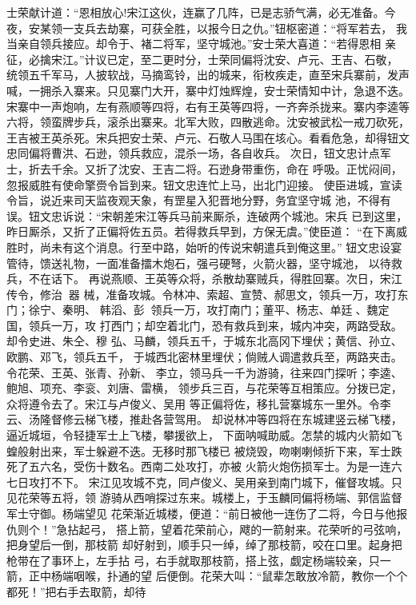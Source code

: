 士荣献计道：“恩相放心!宋江这伙，连赢了几阵，已是志骄气满，必无准备。今
夜，安某领一支兵去劫寨，可获全胜，以报今日之仇。”钮枢密道：“将军若去，
我当亲自领兵接应。却令于、褚二将军，坚守城池。”安士荣大喜道：“若得恩相
亲征，必擒宋江。”计议已定，至二更时分，士荣同偏将沈安、卢元、王吉、石敬，
统领五千军马，人披软战，马摘鸾铃，出的城来，衔枚疾走，直至宋兵寨前，发声
喊，一拥杀入寨来。只见寨门大开，寨中灯烛辉煌，安士荣情知中计，急退不迭。
宋寨中一声炮响，左有燕顺等四将，右有王英等四将，一齐奔杀拢来。寨内李逵等
六将，领蛮牌步兵，滚杀出寨来。北军大败，四散逃命。沈安被武松一戒刀砍死，
王吉被王英杀死。宋兵把安士荣、卢元、石敬人马围在垓心。看看危急，却得钮文
忠同偏将曹洪、石逊，领兵救应，混杀一场，各自收兵。
次日，钮文忠计点军士，折去千余。又折了沈安、王吉二将。石逊身带重伤，命在
呼吸。正忧闷间，忽报威胜有使命擎赍令旨到来。钮文忠连忙上马，出北门迎接。
使臣进城，宣读令旨，说近来司天监夜观天象，有罡星入犯晋地分野，务宜坚守城
池，不得有误。钮文忠诉说：“宋朝差宋江等兵马前来厮杀，连破两个城池。宋兵
已到这里，昨日厮杀，又折了正偏将佐五员。若得救兵早到，方保无虞。”使臣道：
“在下离威胜时，尚未有这个消息。行至中路，始听的传说宋朝遣兵到俺这里。”
钮文忠设宴管待，馈送礼物，一面准备擂木炮石，强弓硬弩，火箭火器，坚守城池，
以待救兵，不在话下。
再说燕顺、王英等众将，杀散劫寨贼兵，得胜回寨。次日，宋江传令，修治器
械，准备攻城。令林冲、索超、宣赞、郝思文，领兵一万，攻打东门；徐宁、秦明、
韩滔、彭，领兵一万，攻打南门；董平、杨志、单廷、魏定国，领兵一万，攻
打西门；却空着北门，恐有救兵到来，城内冲突，两路受敌。却令史进、朱仝、穆
弘、马麟，领兵五千，于城东北高冈下埋伏；黄信、孙立、欧鹏、邓飞，领兵五千，
于城西北密林里埋伏；倘贼人调遣救兵至，两路夹击。令花荣、王英、张青、孙新、
李立，领马兵一千为游骑，往来四门探听；李逵、鲍旭、项充、李衮、刘唐、雷横，
领步兵三百，与花荣等互相策应。分拨已定，众将遵令去了。宋江与卢俊义、吴用
等正偏将佐，移扎营寨城东一里外。令李云、汤隆督修云梯飞楼，推赴各营驾用。
却说林冲等四将在东城建竖云梯飞楼，逼近城垣，令轻捷军士上飞楼，攀援欲上，
下面呐喊助威。怎禁的城内火箭如飞蝗般射出来，军士躲避不迭。无移时那飞楼已
被烧毁，吻喇喇倾折下来，军士跌死了五六名，受伤十数名。西南二处攻打，亦被
火箭火炮伤损军士。为是一连六七日攻打不下。
宋江见攻城不克，同卢俊义、吴用亲到南门城下，催督攻城。只见花荣等五将，领
游骑从西哨探过东来。城楼上，于玉麟同偏将杨端、郭信监督军士守御。杨端望见
花荣渐近城楼，便道：“前日被他一连伤了二将，今日与他报仇则个！”急拈起弓，
搭上箭，望着花荣前心，飕的一箭射来。花荣听的弓弦响，把身望后一倒，那枝箭
却好射到，顺手只一绰，绰了那枝箭，咬在口里。起身把枪带在了事环上，左手拈
弓，右手就取那枝箭，搭上弦，觑定杨端较亲，只一箭，正中杨端咽喉，扑通的望
后便倒。花荣大叫：“鼠辈怎敢放冷箭，教你一个个都死！”把右手去取箭，却待
